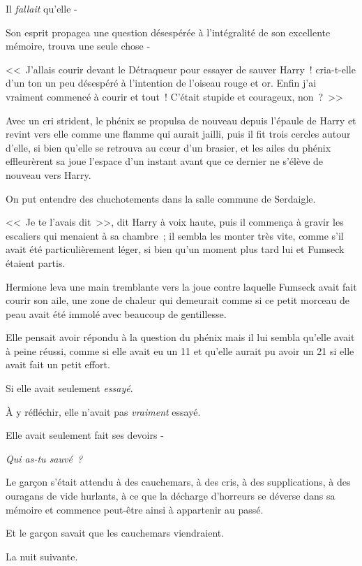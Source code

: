 Il \emph{fallait} qu'elle -

Son esprit propagea une question désespérée à l'intégralité de son excellente mémoire, trouva une seule chose -

<<~J'allais courir devant le Détraqueur pour essayer de sauver Harry~! cria-t-elle d'un ton un peu désespéré à l'intention de l'oiseau rouge et or. Enfin j'ai vraiment commencé à courir et tout~! C'était stupide et courageux, non~?~>>

Avec un cri strident, le phénix se propulsa de nouveau depuis l'épaule de Harry et revint vers elle comme une flamme qui aurait jailli, puis il fit trois cercles autour d'elle, si bien qu'elle se retrouva au cœur d'un brasier, et les ailes du phénix effleurèrent sa joue l'espace d'un instant avant que ce dernier ne s'élève de nouveau vers Harry.

On put entendre des chuchotements dans la salle commune de Serdaigle.

<<~Je te l'avais dit~>>, dit Harry à voix haute, puis il commença à gravir les escaliers qui menaient à sa chambre~; il sembla les monter très vite, comme s'il avait été particulièrement léger, si bien qu'un moment plus tard lui et Fumseck étaient partis.

Hermione leva une main tremblante vers la joue contre laquelle Fumseck avait fait courir son aile, une zone de chaleur qui demeurait comme si ce petit morceau de peau avait été immolé avec beaucoup de gentillesse.

Elle pensait avoir répondu à la question du phénix mais il lui sembla qu'elle avait à peine réussi, comme si elle avait eu un 11 et qu'elle aurait pu avoir un 21 si elle avait fait un petit effort.

Si elle avait seulement \emph{essayé}.

À y réfléchir, elle n'avait pas \emph{vraiment} essayé.

Elle avait seulement fait ses devoirs -

\emph{Qui as-tu sauvé~?}


Le garçon s'était attendu à des cauchemars, à des cris, à des supplications, à des ouragans de vide hurlants, à ce que la décharge d'horreurs se déverse dans sa mémoire et commence peut-être ainsi à appartenir au passé.

Et le garçon savait que les cauchemars viendraient.

La nuit suivante.

